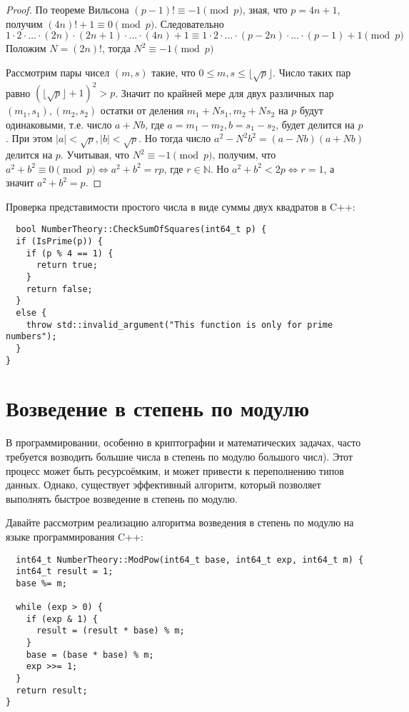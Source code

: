\documentclass[12pt, a4paper, openany]{book}
\begin{document}
\begin{proof}
    По теореме Вильсона $(p - 1)! \equiv -1 \pmod{p}$, зная, что $p = 4n + 1$, получим $(4n)! + 1 \equiv 0 \pmod{p}$. Следовательно $1 \cdot 2 \cdot \ldots \cdot (2n) \cdot (2n + 1) \cdot \ldots \cdot (4n) + 1 \equiv 1 \cdot 2 \cdot \ldots \cdot (p - 2n) \cdot \ldots \cdot (p - 1) + 1 \pmod{p}$ Положим $N = (2n)!$, тогда $N^2 \equiv -1 \pmod{p}$

    Рассмотрим пары чисел $(m,s)$ такие, что $0 \leq m,s \leq \lfloor \sqrt{p} \rfloor$. Число таких пар равно $(\lfloor \sqrt{p} \rfloor + 1)^2 > p$. Значит по крайней мере для двух различных пар $(m_1, s_1), (m_2, s_2)$ остатки от деления $m_1 + Ns_1, m_2 + Ns_2$ на $p$ будут одинаковыми, т.е. число $a + Nb$, где $a = m_1 - m_2, b = s_1 - s_2$, будет делится на $p$. При этом $\lvert a \rvert < \sqrt{p}, \lvert b \rvert < \sqrt{p}$. Но тогда число $a^2 - N^2b^2 = (a - Nb)(a + Nb)$ делится на $p$. Учитывая, что $N^2 \equiv -1 \pmod{p}$, получим, что $a^2 + b^ 2 \equiv 0 \pmod{p} \Leftrightarrow a^2 + b^2 = rp$, где $r \in \mathbb{N}$. Но $a^2 + b^2 < 2p \Leftrightarrow r = 1$, а значит $a^2 + b^2 = p$. 
\end{proof}

\newpage
\noindent
    Проверка представимости простого числа в виде суммы двух квадратов в C++:
    
\begin{lstlisting}
  bool NumberTheory::CheckSumOfSquares(int64_t p) {
  if (IsPrime(p)) {
    if (p % 4 == 1) {
      return true;
    }
    return false;
  }
  else {
    throw std::invalid_argument("This function is only for prime numbers");
  }
}
\end{lstlisting}

\section{Возведение в степень по модулю}

    В программировании, особенно в криптографии и математических задачах, часто требуется возводить большие числа в степень по модулю большого числ). Этот процесс может быть ресурсоёмким, и может привести к переполнению типов данных. Однако, существует эффективный алгоритм, который позволяет выполнять быстрое возведение в степень по модулю.

    Давайте рассмотрим реализацию алгоритма возведения в степень по модулю на языке программирования C++:

\begin{lstlisting}
  int64_t NumberTheory::ModPow(int64_t base, int64_t exp, int64_t m) {
  int64_t result = 1;
  base %= m;
  
  while (exp > 0) {
    if (exp & 1) {
      result = (result * base) % m;
    }
    base = (base * base) % m;
    exp >>= 1;
  }
  return result;
}
\end{lstlisting}
\end{document}
